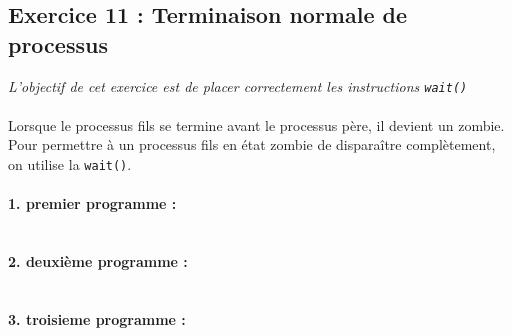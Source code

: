 \subsection{Exercice 11 : Terminaison normale de processus}
\textit{L’objectif de cet exercice est de placer correctement les instructions \texttt{wait()}}
\\\\
Lorsque le processus fils se termine avant le processus père, il devient un zombie. Pour permettre à un processus fils en état zombie de disparaître complètement, on utilise la \texttt{wait()}.

\paragraph{1. premier programme :}
\inputminted[linenos,firstline=8,lastline=14]{cpp}{../sources/cpp/TP5-6/ex11-programme1.c}

\paragraph{2. deuxième programme :}
\inputminted[linenos,firstline=8,lastline=17]{cpp}{../sources/cpp/TP5-6/ex11-programme2.c}

\paragraph{3. troisieme programme :}
\inputminted[linenos,firstline=8,lastline=22]{cpp}{../sources/cpp/TP5-6/ex11-programme3.c}
